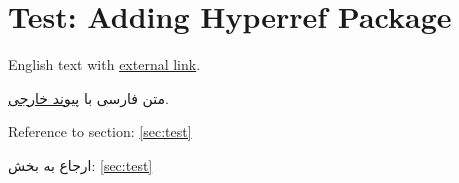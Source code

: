 \documentclass[12pt,a4paper]{article}
\newcommand{\fa}[1]{\textfarsi{#1}}
\newcommand{\en}[1]{\textenglish{#1}}
\begin{document}
\section*{Test: Adding Hyperref Package}
\label{sec:test}

\en{English text with \href{https://www.latex-project.org}{external link}.}

\fa{متن فارسی با \href{https://www.google.com}{پیوند خارجی}.}

\en{Reference to section: \ref{sec:test}}

\fa{ارجاع به بخش: \ref{sec:test}}
\end{document}
